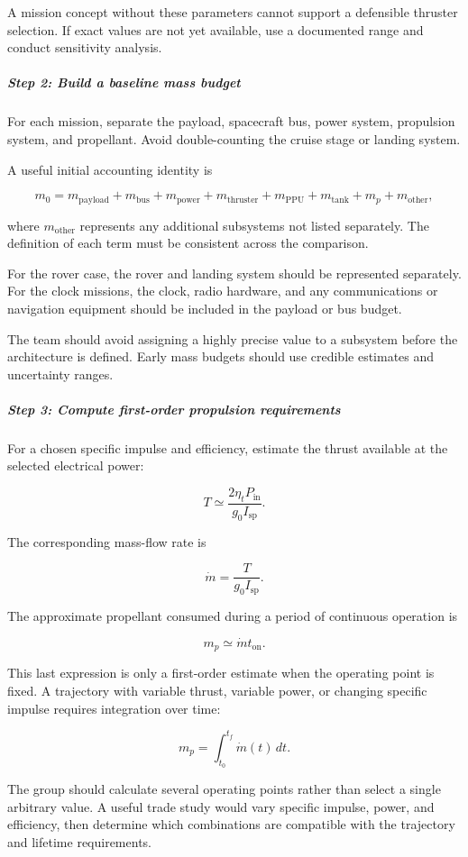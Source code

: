 A mission concept without these parameters cannot support a
defensible thruster selection. If exact values are not yet
available, use a documented range and conduct sensitivity
analysis.

\subparagraph{Step 2: Build a baseline mass budget}

For each mission, separate the payload, spacecraft bus,
power system, propulsion system, and propellant. Avoid
double-counting the cruise stage or landing system.

A useful initial accounting identity is

\[
	m_0 =
	m_{\mathrm{payload}}
	+
	m_{\mathrm{bus}}
	+
	m_{\mathrm{power}}
	+
	m_{\mathrm{thruster}}
	+
	m_{\mathrm{PPU}}
	+
	m_{\mathrm{tank}}
	+
	m_p
	+
	m_{\mathrm{other}},
\]

where \(m_{\mathrm{other}}\) represents any additional
subsystems not listed separately. The definition of each
term must be consistent across the comparison.

For the rover case, the rover and landing system should be
represented separately. For the clock missions, the clock,
radio hardware, and any communications or navigation equipment
should be included in the payload or bus budget.

The team should avoid assigning a highly precise value to
a subsystem before the architecture is defined. Early mass
budgets should use credible estimates and uncertainty ranges.

\subparagraph{Step 3: Compute first-order propulsion requirements}

For a chosen specific impulse and efficiency, estimate the
thrust available at the selected electrical power:

\[
	T \simeq
	\frac{2\eta_t P_{\mathrm{in}}}
	{g_0 I_{\mathrm{sp}}}.
\]

The corresponding mass-flow rate is

\[
	\dot{m} =
	\frac{T}{g_0 I_{\mathrm{sp}}}.
\]

The approximate propellant consumed during a period of
continuous operation is

\[
	m_p \simeq \dot{m}t_{\mathrm{on}}.
\]

This last expression is only a first-order estimate when
the operating point is fixed. A trajectory with variable
thrust, variable power, or changing specific impulse requires
integration over time:

\[
	m_p =
	\int_{t_0}^{t_f} \dot{m}(t)\,dt.
\]

The group should calculate several operating points rather
than select a single arbitrary value. A useful trade study
would vary specific impulse, power, and efficiency, then
determine which combinations are compatible with the
trajectory and lifetime requirements.

